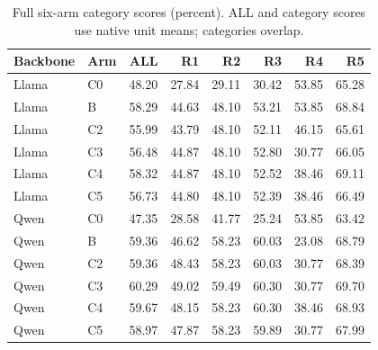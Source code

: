 \begin{table}[htbp]
\centering\small
\caption{Full six-arm category scores (percent). ALL and category scores use native unit means; categories overlap.}
\label{tab:full-categories}
\setlength{\tabcolsep}{6pt}
\begin{tabular}{@{}llrrrrrr@{}}
\toprule
Backbone & Arm & ALL & R1 & R2 & R3 & R4 & R5 \\
\midrule
Llama & C0 & 48.20 & 27.84 & 29.11 & 30.42 & 53.85 & 65.28 \\
Llama & B & 58.29 & 44.63 & 48.10 & 53.21 & 53.85 & 68.84 \\
Llama & C2 & 55.99 & 43.79 & 48.10 & 52.11 & 46.15 & 65.61 \\
Llama & C3 & 56.48 & 44.87 & 48.10 & 52.80 & 30.77 & 66.05 \\
Llama & C4 & 58.32 & 44.87 & 48.10 & 52.52 & 38.46 & 69.11 \\
Llama & C5 & 56.73 & 44.80 & 48.10 & 52.39 & 38.46 & 66.49 \\
Qwen & C0 & 47.35 & 28.58 & 41.77 & 25.24 & 53.85 & 63.42 \\
Qwen & B & 59.36 & 46.62 & 58.23 & 60.03 & 23.08 & 68.79 \\
Qwen & C2 & 59.36 & 48.43 & 58.23 & 60.03 & 30.77 & 68.39 \\
Qwen & C3 & 60.29 & 49.02 & 59.49 & 60.30 & 30.77 & 69.70 \\
Qwen & C4 & 59.67 & 48.15 & 58.23 & 60.30 & 38.46 & 68.93 \\
Qwen & C5 & 58.97 & 47.87 & 58.23 & 59.89 & 30.77 & 67.99 \\
\bottomrule
\end{tabular}
\end{table}
